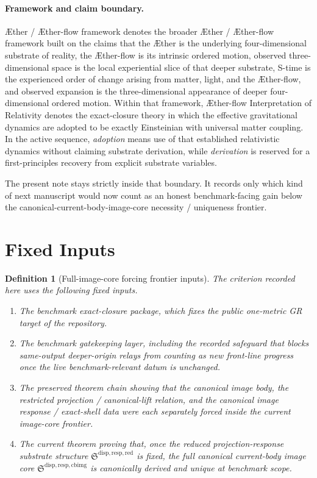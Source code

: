 \documentclass[11pt]{article}
\newcommand{\Aether}{\AE{}ther}
\newcommand{\Aflow}{\AE{}ther-flow}
\newcommand{\TheoryName}{\Aflow{} Interpretation of Relativity}
\newcommand{\TheoryProgram}{\Aether{} / \Aflow{} framework}
\newcommand{\ReducedStructure}{\mathfrak S^{\mathrm{disp,resp,red}}}
\newcommand{\CurrentBodyImageCore}{\mathfrak S^{\mathrm{disp,resp,cbimg}}}
\newtheorem{definition}{Definition}
\begin{document}
\paragraph{Framework and claim boundary.}
\TheoryProgram{} denotes the broader \Aether{} / \Aflow{} framework built on the claims that the \Aether{} is the underlying four-dimensional substrate of reality, the \Aflow{} is its intrinsic ordered motion, observed three-dimensional space is the local experiential slice of that deeper substrate, S-time is the experienced order of change arising from matter, light, and the \Aflow{}, and observed expansion is the three-dimensional appearance of deeper four-dimensional ordered motion. Within that framework, \TheoryName{} denotes the exact-closure theory in which the effective gravitational dynamics are adopted to be exactly Einsteinian with universal matter coupling. In the active sequence, \emph{adoption} means use of that established relativistic dynamics without claiming substrate derivation, while \emph{derivation} is reserved for a first-principles recovery from explicit substrate variables.

The present note stays strictly inside that boundary. It records only which kind of next manuscript would now count as an honest benchmark-facing gain below the canonical-current-body-image-core necessity / uniqueness frontier.

\section{Fixed Inputs}

\begin{definition}[Full-image-core forcing frontier inputs]
The criterion recorded here uses the following fixed inputs.
\begin{enumerate}
    \item The benchmark exact-closure package, which fixes the public one-metric GR target of the repository.
    \item The benchmark gatekeeping layer, including the recorded safeguard that blocks same-output deeper-origin relays from counting as new front-line progress once the live benchmark-relevant datum is unchanged.
    \item The preserved theorem chain showing that the canonical image body, the restricted projection / canonical-lift relation, and the canonical image response / exact-shell data were each separately forced inside the current image-core frontier.
    \item The current theorem proving that, once the reduced projection-response substrate structure \(\ReducedStructure\) is fixed, the full canonical current-body image core \(\CurrentBodyImageCore\) is canonically derived and unique at benchmark scope.
\end{enumerate}
\end{definition}
\end{document}
